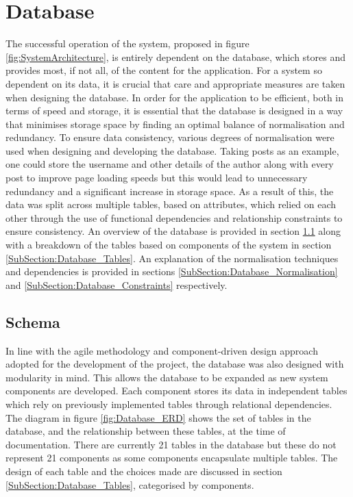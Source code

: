 \section{Database}
The successful operation of the system, proposed in figure \ref{fig:SystemArchitecture}, is entirely dependent on the database, which stores and provides most, if not all, of the content for the application. For a system so dependent on its data, it is crucial that care and appropriate measures are taken when designing the database. In order for the application to be efficient, both in terms of speed and storage, it is essential that the database is designed in a way that minimises storage space by finding an optimal balance of normalisation and redundancy. To ensure data consistency, various degrees of normalisation were used when designing and developing the database. Taking posts as an example, one could store the username and other details of the author along with every post to improve page loading speeds but this would lead to unnecessary redundancy and a significant increase in storage space. As a result of this, the data was split across multiple tables, based on attributes, which relied on each other through the use of functional dependencies and relationship constraints to ensure consistency. An overview of the database is provided in section \ref{SubSection:Database_Schema} along with a breakdown of the tables based on components of the system in section \ref{SubSection:Database_Tables}. An explanation of the normalisation techniques and dependencies is provided in sections \ref{SubSection:Database_Normalisation} and \ref{SubSection:Database_Constraints} respectively.

\subsection{Schema}
\label{SubSection:Database_Schema}
In line with the agile methodology and component-driven design approach adopted for the development of the project, the database was also designed with modularity in mind. This allows the database to be expanded as new system components are developed. Each component stores its data in independent tables which rely on previously implemented tables through relational dependencies. The diagram in figure \ref{fig:Database_ERD} shows the set of tables in the database, and the relationship between these tables, at the time of documentation. There are currently 21 tables in the database but these do not represent 21 components as some components encapsulate multiple tables. The design of each table and the choices made are discussed in section \ref{SubSection:Database_Tables}, categorised by components.

